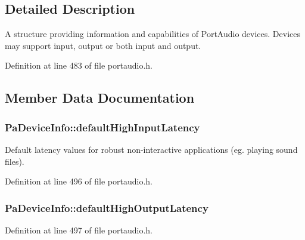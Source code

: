 \subsection{Detailed Description}
A structure providing information and capabilities of Port\+Audio devices. Devices may support input, output or both input and output. 

Definition at line 483 of file portaudio.\+h.



\subsection{Member Data Documentation}
\subsubsection[{\texorpdfstring{default\+High\+Input\+Latency}{defaultHighInputLatency}}]{ Pa\+Device\+Info\+::default\+High\+Input\+Latency}\hypertarget{struct_pa_device_info_a4214826038fcaf374beb9816024e6c9f}{}\label{struct_pa_device_info_a4214826038fcaf374beb9816024e6c9f}
Default latency values for robust non-\/interactive applications (eg. playing sound files). 

Definition at line 496 of file portaudio.\+h.

\subsubsection[{\texorpdfstring{default\+High\+Output\+Latency}{defaultHighOutputLatency}}]{ Pa\+Device\+Info\+::default\+High\+Output\+Latency}\hypertarget{struct_pa_device_info_a2a43dbc2b158806a937065bda037070e}{}\label{struct_pa_device_info_a2a43dbc2b158806a937065bda037070e}


Definition at line 497 of file portaudio.\+h.

